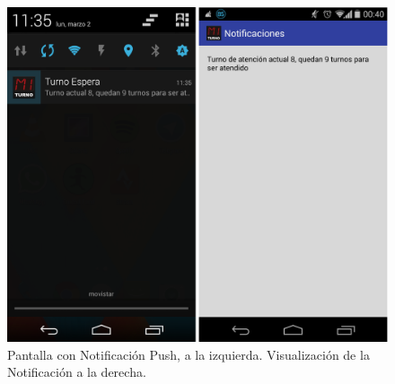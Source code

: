 \begin{figure}[H]
\centering
\includegraphics[scale=0.30]{images/capitulo5/notificaciones.png}
\caption{Pantalla con Notificación Push, a la izquierda. Visualización de la Notificación a la derecha.}
\label{notificaciones}
\end{figure}



